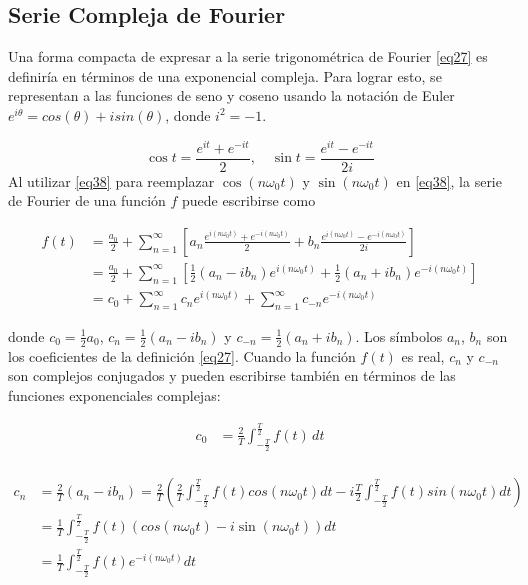 \subsection{Serie Compleja de Fourier}
Una forma compacta de expresar a la serie trigonométrica de Fourier \eqref{eq27} es definiría en términos de una exponencial compleja. Para lograr esto, se representan a las funciones de seno y coseno usando la notación de Euler $e^{i\theta} = cos(\theta) + isin(\theta)$, donde $i^{2} = -1$. ~\cite{youtubeComplexFourier}

\begin{equation}\label{eq38}
	\cos t = \frac{e^{it} + e^{-it}}{2}, \quad \sin t = \frac{e^{it} - e^{-it}}{2i}
\end{equation}
Al utilizar \eqref{eq38} para reemplazar $\cos \left(n\omega_0 t\right)$ y $\sin \left(n\omega_0 t\right)$ en \eqref{eq38}, la serie de Fourier de una función $f$ puede escribirse como

\begin{equation} \label{eq39}
	\begin{split}
		f(t) &= \frac{a_0}{2} + \sum_{n=1}^{\infty} \left[a_n \frac{e^{i(n\omega_0 t)} + e^{-i(n\omega_0 t)}}{2} + b_n \frac{e^{i(n\omega_0 t)} - e^{-i(n\omega_0 t)}}{2i}\right] \\
		&= \frac{a_0}{2} + \sum_{n=1}^{\infty} \left[\frac{1}{2} \left(a_n - i b_n\right) e^{i (n\omega_0 t)} + \frac{1}{2} \left(a_n + i b_n\right) e^{-i (n\omega_0 t)}\right] \\
		&= c_0 + \sum_{n=1}^{\infty} c_n e^{i (n\omega_0 t)} + \sum_{n=1}^{\infty} c_{-n} e^{-i(n\omega_0 t)}
	\end{split}
\end{equation}


donde $c_0 = \frac{1}{2} a_0$, $c_n = \frac{1}{2} (a_n - i b_n)$ y $c_{-n} = \frac{1}{2} (a_n + i b_n)$. Los símbolos $a_n$, $b_n$ son los coeficientes de la definición \eqref{eq27}. Cuando la función $f(t)$ es real, $c_n$ y $c_{-n}$ son complejos conjugados y pueden escribirse también en términos de las funciones exponenciales complejas:

\begin{equation} \label{eq40}
	\begin{split}
		c_0 &= \frac{2}{T} \int_{-\frac{T}{2}}^{\frac{T}{2}} f(t) \, dt \\
	\end{split}
\end{equation}

\begin{equation} \label{eq41}
	\begin{split}
		c_n &= \frac{2}{T} \left(a_n - i b_n\right) = \frac{2}{T} \left(\frac{2}{T} \int_{-\frac{T}{2}}^{\frac{T}{2}} f(t) cos(n\omega_0 t)  dt - i \frac{T}{2} \int_{-\frac{T}{2}}^{\frac{T}{2}} f(t) sin(n\omega_0 t) dt\right) \\
		&=  \frac{1}{T} \int_{-\frac{T}{2}}^{\frac{T}{2}} f(t) \left( cos(n\omega_0 t)  - i \sin (n\omega_0 t)  \right) dt \\
		&= \frac{1}{T} \int_{-\frac{T}{2}}^{\frac{T}{2}} f(t) e^{-i (n\omega_0 t)}  dt		
	\end{split}
\end{equation}

